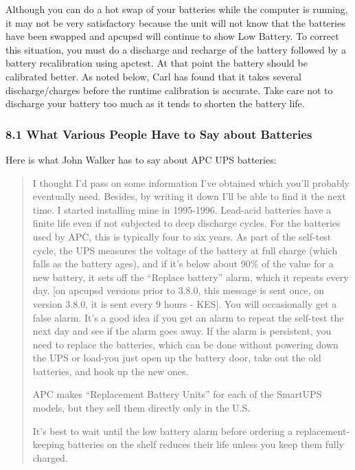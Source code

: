 Although you can do a hot swap of your batteries while the computer is
running, it may not be very satisfactory because the unit will not know that
the batteries have been swapped and apcupsd will continue to show Low Battery.
To correct this situation, you must do a discharge and recharge of the
battery followed by a battery recalibration using apctest.  At that point the
battery should be calibrated better.  As noted below, Carl has found that it
takes several discharge/charges before the runtime calibration is accurate. 
Take care not to discharge your battery too much as it tends to shorten the
battery life. 

\label{What-Various-People-Have-to-Say-about-Batteries}

\subsubsection*{8.1 What Various People Have to Say about Batteries}

\label{index-Batteries-145}
Here is what John Walker has to say about APC UPS batteries:  

\begin{quote}

I thought I'd pass on some information I've obtained which you'll probably
eventually need. Besides, by writing it down I'll be able to find it the next
time. I started installing mine in 1995-1996. Lead-acid batteries have a
finite life even if not subjected to deep discharge cycles. For the batteries
used by APC, this is typically four to six years. As part of the self-test
cycle, the UPS measures the voltage of the battery at full charge (which falls
as the battery ages), and if it's below about 90\% of the value for a new
battery, it sets off the ``Replace battery'' alarm, which it repeats every
day. [on apcupsd versions prior to 3.8.0, this message is sent once, on
version 3.8.0, it is sent every 9 hours - KES]. You will occasionally get a
false alarm. It's a good idea if you get an alarm to repeat the self-test the
next day and see if the alarm goes away. If the alarm is persistent, you need
to replace the batteries, which can be done without powering down the UPS or
load-you just open up the battery door, take out the old batteries, and hook
up the new ones.  

APC makes ``Replacement Battery Units'' for each of the SmartUPS models, but
they sell them directly only in the U.S.  

It's best to wait until the low battery alarm before ordering a
replacement-keeping batteries on the shelf reduces their life unless you keep
them fully charged. 
\end{quote}

